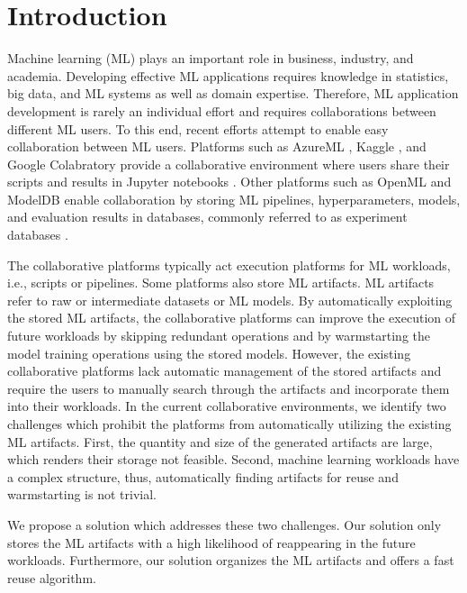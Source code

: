 \section{Introduction} \label{sec-introduction}
Machine learning (ML) plays an important role in business, industry, and academia. 
Developing effective ML applications requires knowledge in statistics, big data, and ML systems as well as domain expertise.
Therefore, ML application development is rarely an individual effort and requires collaborations between different ML users.
To this end, recent efforts attempt to enable easy collaboration between ML users.
Platforms such as AzureML \cite{team2016azureml}, Kaggle \cite{kagglewebsite}, and Google Colabratory \cite{googlecolab} provide a collaborative environment where users share their scripts and results in Jupyter notebooks \cite{Kluyver:2016aa}.
Other platforms such as OpenML \cite{vanschoren2014openml} and ModelDB \cite{vartak2016m} enable collaboration by storing ML pipelines, hyperparameters, models, and evaluation results in databases, commonly referred to as experiment databases \cite{Vanschoren2012}.

The collaborative platforms typically act execution platforms for ML workloads, i.e., scripts or pipelines.
Some platforms also store ML artifacts.
ML artifacts refer to raw or intermediate datasets or ML models.
By automatically exploiting the stored ML artifacts, the collaborative platforms can improve the execution of future workloads by skipping redundant operations and by warmstarting the model training operations using the stored models.
However, the existing collaborative platforms lack automatic management of the stored artifacts and require the users to manually search through the artifacts and incorporate them into their workloads.
In the current collaborative environments, we identify two challenges which prohibit the platforms from automatically utilizing the existing ML artifacts.
First, the quantity and size of the generated artifacts are large, which renders their storage not feasible.
Second, machine learning workloads have a complex structure, thus, automatically finding artifacts for reuse and warmstarting is not trivial.

We propose a solution which addresses these two challenges.
Our solution only stores the ML artifacts with a high likelihood of reappearing in the future workloads.
Furthermore, our solution organizes the ML artifacts and offers a fast reuse algorithm.

